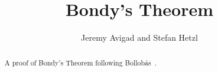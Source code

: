 \documentclass[11pt,a4paper]{article}
\begin{document}
\title{Bondy's Theorem}
\author{Jeremy Avigad and Stefan Hetzl}
\maketitle

\begin{abstract}
A proof of Bondy's Theorem following Bollob\'{a}s~\cite{Bollobas86Combinatorics}.
\end{abstract}





\end{document}
